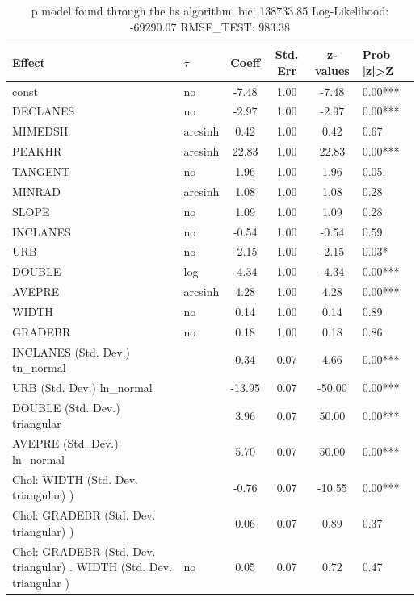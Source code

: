 \begin{table}
	\caption{p model found through the hs algorithm. bic: 138733.85 Log-Likelihood: -69290.07 RMSE_TEST: 983.38}
	\begin{center}
		\begin{tabular}{|l|l|c|c|c|l|}
			\hline
			Effect & $\tau$ & Coeff & Std. Err & z-values & Prob |z|>Z \\
			\hline
			const & no & -7.48 & 1.00 & -7.48 & 0.00*** \\
			\hline
			DECLANES & no & -2.97 & 1.00 & -2.97 & 0.00*** \\
			\hline
			MIMEDSH & arcsinh & 0.42 & 1.00 & 0.42 & 0.67 \\
			\hline
			PEAKHR & arcsinh & 22.83 & 1.00 & 22.83 & 0.00*** \\
			\hline
			TANGENT & no & 1.96 & 1.00 & 1.96 & 0.05. \\
			\hline
			MINRAD & arcsinh & 1.08 & 1.00 & 1.08 & 0.28 \\
			\hline
			SLOPE & no & 1.09 & 1.00 & 1.09 & 0.28 \\
			\hline
			INCLANES & no & -0.54 & 1.00 & -0.54 & 0.59 \\
			\hline
			URB & no & -2.15 & 1.00 & -2.15 & 0.03* \\
			\hline
			DOUBLE & log & -4.34 & 1.00 & -4.34 & 0.00*** \\
			\hline
			AVEPRE & arcsinh & 4.28 & 1.00 & 4.28 & 0.00*** \\
			\hline
			WIDTH & no & 0.14 & 1.00 & 0.14 & 0.89 \\
			\hline
			GRADEBR & no & 0.18 & 1.00 & 0.18 & 0.86 \\
			\hline
			INCLANES (Std. Dev.) tn_normal &  & 0.34 & 0.07 & 4.66 & 0.00*** \\
			\hline
			URB (Std. Dev.) ln_normal &  & -13.95 & 0.07 & -50.00 & 0.00*** \\
			\hline
			DOUBLE (Std. Dev.) triangular &  & 3.96 & 0.07 & 50.00 & 0.00*** \\
			\hline
			AVEPRE (Std. Dev.) ln_normal &  & 5.70 & 0.07 & 50.00 & 0.00*** \\
			\hline
			 Chol: WIDTH (Std. Dev. triangular) ) &  & -0.76 & 0.07 & -10.55 & 0.00*** \\
			\hline
			 Chol: GRADEBR (Std. Dev. triangular) ) &  & 0.06 & 0.07 & 0.89 & 0.37 \\
			\hline
			 Chol: GRADEBR (Std. Dev. triangular) . WIDTH (Std. Dev.   triangular ) & no & 0.05 & 0.07 & 0.72 & 0.47 \\

\end{tabular}
\end{center}
\end{table}
